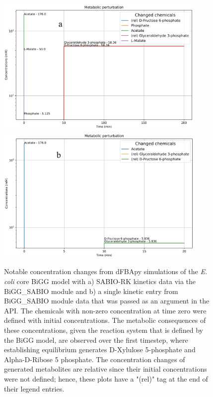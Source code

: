 \begin{figure}
    \centering
    \includegraphics[width = 0.9\textwidth]{images/WCMpy/SABIO_dfba.png} \\
    \includegraphics[width = 0.9\textwidth]{images/WCMpy/simple_argument.png}
    \caption{
        Notable concentration changes from dFBApy simulations of the \textit{E. coli} core BiGG model with a) SABIO-RK kinetics data via the BiGG\_SABIO module and b) a single kinetic entry from BiGG\_SABIO module data that was passed as an argument in the API. The chemicals with non-zero concentration at time zero were defined with initial concentrations. The metabolic consequences of these concentrations, given the reaction system that is defined by the BiGG model, are observed over the first timestep, where establishing equilibrium generates D-Xylulose 5-phosphate and Alpha-D-Ribose 5 phosphate. The concentration changes of generated metabolites are relative since their initial concentrations were not defined; hence, these plots have a "(rel)" tag at the end of their legend entries.
    }
    \label{dfba}
\end{figure}


